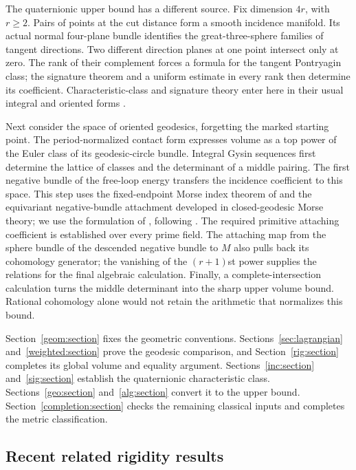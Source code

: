 The quaternionic upper bound has a different source. Fix dimension
$4r$, with $r\ge2$. Pairs of points at the cut distance form a
smooth incidence manifold. Its actual normal four-plane bundle
identifies the great-three-sphere families of tangent directions.
Two different direction planes at one point intersect only at zero.
The rank of their complement forces a formula for the tangent
Pontryagin class; the signature theorem and a uniform estimate in
every rank then determine its coefficient. Characteristic-class
and signature theory enter here in their usual integral and
oriented forms \citep{MilnorStasheff1974}.

Next consider the space of oriented geodesics, forgetting the
marked starting point. The period-normalized contact form expresses
volume as a top power of the Euler class of its geodesic-circle
bundle. Integral Gysin sequences first determine the lattice of
classes and the determinant of a middle pairing. The first negative
bundle of the free-loop energy transfers the incidence coefficient
to this space. This step uses the
fixed-endpoint Morse index theorem of \citet{Milnor1963} and the
equivariant negative-bundle attachment developed in closed-geodesic
Morse theory; we use the formulation of
\citet[Section~7]{OttosenBokstedt2007}, following
\citet{Klingenberg1978}. The required primitive attaching coefficient
is established over every prime field. The attaching map from
the sphere bundle of the descended negative bundle to $M$ also
pulls back its cohomology generator; the vanishing of the
$(r+1)$st power supplies the relations for the final algebraic
calculation. Finally, a complete-intersection calculation turns
the middle determinant
into the sharp upper volume bound. Rational cohomology
alone would not retain the arithmetic that normalizes this bound.

Section~\ref{geom:section} fixes the geometric conventions.
Sections~\ref{sec:lagrangian} and~\ref{weighted:section} prove the
geodesic comparison, and Section~\ref{rig:section} completes its
global volume and equality argument. Sections~\ref{inc:section}
and~\ref{sig:section} establish the quaternionic characteristic
class. Sections~\ref{geo:section} and~\ref{alg:section} convert it
to the upper bound. Section~\ref{completion:section} checks the
remaining classical inputs and completes the metric classification.

\subsection{Recent related rigidity results}

